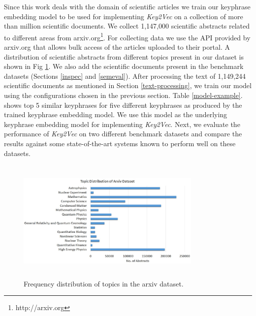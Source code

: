 \documentclass[conference]{IEEEtran}
\begin{document}
Since this work deals with the domain of scientific articles we train our keyphrase embedding model to be used for implementing \textit{Key2Vec} on a collection of more than million scientific documents. We collect 1,147,000 scientific abstracts related to different areas from arxiv.org\footnote{http://arxiv.org}. For collecting data we use the API provided by arxiv.org that allows bulk access of the articles uploaded to their portal. A distribution of scientific abstracts from different topics present in our dataset is shown in Fig \ref{fig:arxiv-topics}. We also add the scientific documents present in the benchmark datasets (Sections \ref{inspec} and \ref{semeval}). After processing the text of 1,149,244 scientific documents as mentioned in Section \ref{text-processing}, we train our model using the configurations chosen in the previous section. Table \ref{model-example}. shows top 5 similar keyphrases for five different keyphrases as produced by the trained keyphrase embedding model. We use this model as the underlying keyphrase embedding model for implementing \textit{Key2Vec}. Next, we evaluate the performance of \textit{Key2Vec} on two different benchmark datasets and compare the results against some state-of-the-art systems known to perform well on these datasets.


\begin{figure}
  \includegraphics[width=9cm, height=6cm]{arxiv-topic-distribution.jpg}
\captionsetup{justification=centering}
  \caption{\small Frequency distribution of topics in the arxiv dataset.}
  \label{fig:arxiv-topics}
\end{figure}
\end{document}
